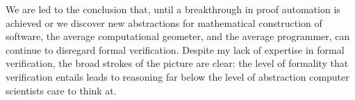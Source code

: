 \documentclass{article}
\begin{document}
We are led to the conclusion that, until a breakthrough in proof automation is achieved or we discover new abstractions for mathematical construction of software, the average computational geometer, and the average programmer, can continue to disregard formal verification.
Despite my lack of expertise in formal verification, the broad strokes of the picture are clear: the level of formality that verification entails leads to reasoning far below the level of abstraction computer scientists care to think at.







\end{document}
